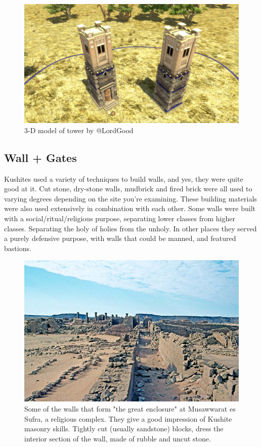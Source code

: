 \documentclass[a4paper,12pt]{scrreprt}
\begin{document}
\begin{figure}[H]
	\centering
	\includegraphics[width=\textwidth]{img/tower/tower}
	\caption{3-D model of tower by @LordGood}
\end{figure}

\subsection{Wall + Gates}

Kushites used a variety of techniques to build walls, and yes, they were quite good at it. Cut stone, dry-stone walls, mudbrick and fired brick were all used to varying degrees depending on the site you’re examining. These building materials were also used extensively in combination with each other. Some walls were built with a social/ritual/religious purpose, separating lower classes from higher classes. Separating the holy of holies from the unholy. In other places they served a purely defensive purpose, with walls that could be manned, and featured bastions.

\begin{figure}[H]
	\centering
	\includegraphics[width=\textwidth]{img/walls_gates/impression_of_wall}
	\caption{Some of the walls that form "the great enclosure" at Musawwarat es Sufra, a religious complex. They give a good impression of Kushite masonry skills. Tightly cut (usually sandstone) blocks, dress the interior section of the wall, made of rubble and uncut stone.}
\end{figure}
\end{document}
